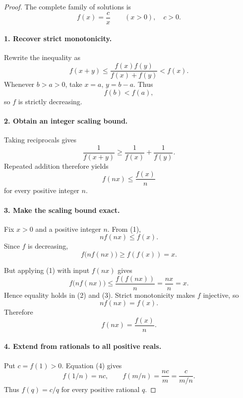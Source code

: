 
\begin{dlsummary}[title={\bfseries Solution 54. The Harmonic Involution},breakable]

\begin{proof}
The complete family of solutions is
\[
\boxed{f(x)=\frac{c}{x}\qquad(x>0),\quad c>0.}
\]

\paragraph{1. Recover strict monotonicity.}

Rewrite the inequality as
\[
f(x+y)\le\frac{f(x)f(y)}{f(x)+f(y)}<f(x).
\]
Whenever \(b>a>0\), take \(x=a\), \(y=b-a\). Thus
\[
f(b)<f(a),
\]
so \(f\) is strictly decreasing.

\paragraph{2. Obtain an integer scaling bound.}

Taking reciprocals gives
\[
\frac1{f(x+y)}\ge\frac1{f(x)}+\frac1{f(y)}.
\]
Repeated addition therefore yields
\[
\boxed{f(nx)\le\frac{f(x)}n} \tag{1}
\]
for every positive integer \(n\).

\paragraph{3. Make the scaling bound exact.}

Fix \(x>0\) and a positive integer \(n\). From (1),
\[
nf(nx)\le f(x).
\]
Since \(f\) is decreasing,
\[
f\bigl(nf(nx)\bigr)\ge f(f(x))=x. \tag{2}
\]

But applying (1) with input \(f(nx)\) gives
\[
f\bigl(nf(nx)\bigr)
\le\frac{f(f(nx))}{n}
=\frac{nx}{n}=x. \tag{3}
\]
Hence equality holds in (2) and (3). Strict monotonicity makes \(f\) injective, so
\[
nf(nx)=f(x).
\]
Therefore
\[
\boxed{f(nx)=\frac{f(x)}n.} \tag{4}
\]

\paragraph{4. Extend from rationals to all positive reals.}

Put \(c=f(1)>0\). Equation (4) gives
\[
f(1/n)=nc,
\qquad
f(m/n)=\frac{nc}{m}=\frac{c}{m/n}.
\]
Thus \(f(q)=c/q\) for every positive rational \(q\).


\end{proof}
\end{dlsummary}
